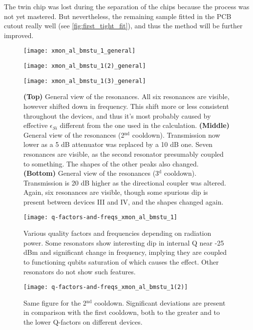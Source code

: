 \documentclass[12pt, twoside]{report}
\numberwithin{equation}{section}
\begin{document}
The twin chip was lost during the separation of the chips because the process was not yet mastered. But nevertheless, the remaining sample fitted in the PCB cutout really well (see \autoref{fig:first_tight_fit}), and thus the method will be further improved.

\begin{figure}[h!]
\centering
\texttt{[image: xmon\_al\_bmstu\_1\_general]}

\texttt{[image: xmon\_al\_bmstu\_1(2)\_general]}

\texttt{[image: xmon\_al\_bmstu\_1(3)\_general]}


\caption{\textbf{(Top)} General view of the resonances. All six resonances are visible, however shifted down in frequency. This shift more or less consistent throughout the devices, and thus it's most probably caused by effective $\epsilon_{Si}$ different from the one used in the calculation. \textbf{(Middle)} General view of the resonances (2$^\text{nd}$ cooldown). Transmission now lower as a 5 dB attenuator was replaced by a 10 dB one. Seven resonances are visible, as the second resonator presumably coupled to something. The shapes of the other peaks also changed. \textbf{(Bottom)} General view of the resonances (3$^\text{d}$ cooldown).  Transmission is 20 dB higher as the directional coupler was altered. Again, six resonances are visible, though some spurious dip is present between devices III and IV, and the shapes changed again.}
\label{fig:second_resonators_general}
\end{figure}


\begin{figure}[h!]
\centering

\texttt{[image: q-factors-and-freqs\_xmon\_al\_bmstu\_1]}

\caption{Various quality factors and frequencies depending on radiation power. Some resonators show interesting dip in internal Q near -25 dBm and significant change in frequency, implying they are coupled to functioning qubits saturation of which causes the effect. Other resonators do not show such features.}
\label{fig:second_q_factors}
\end{figure}

\begin{figure}[h!]
\centering
\texttt{[image: q-factors-and-freqs\_xmon\_al\_bmstu\_1(2)]}
\caption{Same figure for the 2$^\text{nd}$ cooldown. Significant deviations are present in comparison with the first cooldown, both to the greater and to the lower Q-factors on different devices.}
\label{fig:second_q_factors(2)}
\end{figure}
\end{document}
